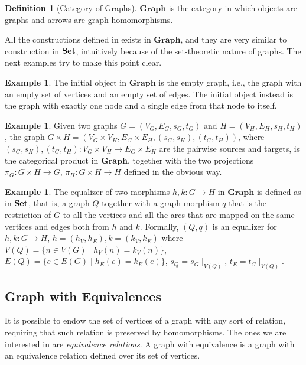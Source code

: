 \documentclass[a4paper, twoside,openright]{report}
\theoremstyle{plain}
\theoremstyle{definition}
\newtheorem{definition}[theorem]{Definition}
\newtheorem{example}[theorem]{Example}
\begin{document}
\begin{definition}[Category of Graphs]\label{def:cat_of_graph}
    $\mathbf{Graph}$ is the category in which objects are graphs and arrows are graph homomorphisms.
\end{definition}

All the constructions defined in  exists in $\mathbf{Graph}$, and they are very similar to construction in $\mathbf{Set}$, intuitively because of the set-theoretic nature of graphs. The next examples try to make this point clear.

\begin{example}\label{ex:in_term_in_graph}
    The initial object in $\mathbf{Graph}$ is the empty graph, i.e., the graph with an empty set of vertices and an empty set of edges. The initial object instead is the graph with exactly one node and a single edge from that node to itself.
\end{example}

\begin{example}
    Given two graphs $G = (V_G, E_G, s_G, t_G)$ and $H=(V_H, E_H, s_H, t_H)$, the graph $G \times H = (V_G\times V_H, E_G \times E_H, (s_G, s_H), (t_G, t_H))$, where $(s_G, s_H), (t_G, t_H):V_G\times V_H \rightarrow E_G \times E_H$ are the pairwise sources and targets, is the categorical product in $\mathbf{Graph}$, together with the two projections $\pi_G: G \times H \rightarrow G$, $\pi_H : G \times H \rightarrow H$ defined in the obvious way.
\end{example}

\begin{example}
    The equalizer of two morphisms $h, k: G \rightarrow H$ in $\mathbf{Graph}$ is defined as in $\mathbf{Set}$, that is,  a graph $Q$ together with a graph morphism $q$ that is the restriction of $G$ to all the vertices and all the arcs that are mapped on the same vertices and edges both from $h$ and $k$. Formally, $(Q, q)$ is an equalizer for $h, k: G \rightarrow H$, $h = (h_V, h_E), k = (k_V, k_E)$ where $V(Q) = \{ n \in V(G) \mid h_V(n) = k_V(n)\}$, $E(Q) = \{ e \in E(G) \mid h_E(e) = k_E(e)\}$, $s_Q = s_G \mid_{V(Q)}$, $t_E = t_G \mid_{V(Q)}$.
\end{example}

\subsection{Graph with Equivalences}

It is possible to endow the set of vertices of a graph with any sort of relation, requiring that such relation is preserved by homomorphisms. The ones we are interested in are \emph{equivalence relations}.
A graph with equivalence is a graph with an equivalence relation defined over its set of vertices.
\end{document}
